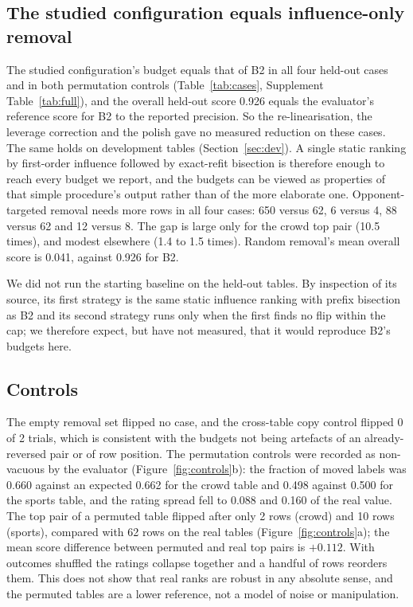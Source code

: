 \documentclass{article}
\begin{document}
\subsection{The studied configuration equals influence-only removal}
The studied configuration's budget equals that of B2 in all four held-out cases and in both permutation controls (Table~\ref{tab:cases}, Supplement Table~\ref{tab:full}), and the overall held-out score 0.926 equals the evaluator's reference score for B2 to the reported precision. %
So the re-linearisation, the leverage correction and the polish gave no measured reduction on these cases. The same holds on development tables (Section~\ref{sec:dev}). A single static ranking by first-order influence followed by exact-refit bisection is therefore enough to reach every budget we report, and the budgets can be viewed as properties of that simple procedure's output rather than of the more elaborate one. Opponent-targeted removal needs more rows in all four cases: 650 versus 62, 6 versus 4, 88 versus 62 and 12 versus 8. The gap is large only for the crowd top pair (10.5 times), and modest elsewhere (1.4 to 1.5 times). Random removal's mean overall score is 0.041, against 0.926 for B2. %

We did not run the starting baseline on the held-out tables. By inspection of its source, its first strategy is the same static influence ranking with prefix bisection as B2 and its second strategy runs only when the first finds no flip within the cap; we therefore expect, but have not measured, that it would reproduce B2's budgets here.

\subsection{Controls}\label{sec:controls}
The empty removal set flipped no case, and the cross-table copy control flipped 0 of 2 trials, which is consistent with the budgets not being artefacts of an already-reversed pair or of row position. The permutation controls were recorded as non-vacuous by the evaluator (Figure~\ref{fig:controls}b): the fraction of moved labels was 0.660 against an expected 0.662 for the crowd table and 0.498 against 0.500 for the sports table, and the rating spread fell to 0.088 and 0.160 of the real value. %
The top pair of a permuted table flipped after only 2 rows (crowd) and 10 rows (sports), compared with 62 rows on the real tables (Figure~\ref{fig:controls}a); the mean score difference between permuted and real top pairs is $+0.112$. %
With outcomes shuffled the ratings collapse together and a handful of rows reorders them. This does not show that real ranks are robust in any absolute sense, and the permuted tables are a lower reference, not a model of noise or manipulation.
\end{document}
